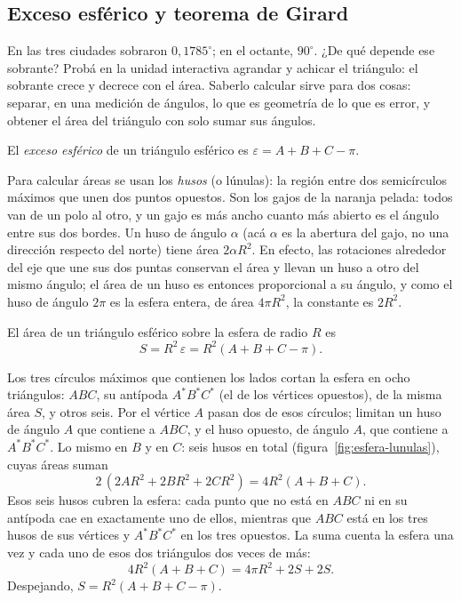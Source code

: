 \subsection{Exceso esférico y teorema de Girard}\label{sec:exceso-esferico}

En las tres ciudades sobraron \(0{,}1785^\circ\); en el octante, \(90^\circ\). ¿De qué depende
ese sobrante? Probá en la unidad interactiva agrandar y achicar el triángulo: el sobrante
crece y decrece con el área. Saberlo calcular sirve para dos cosas: separar, en una medición
de ángulos, lo que es geometría de lo que es error, y obtener el área del triángulo con solo
sumar sus ángulos.

\begin{definicion}
El \emph{exceso esférico} de un triángulo esférico es
\(\varepsilon=A+B+C-\pi\).
\end{definicion}

Para calcular áreas se usan los \emph{husos} (o lúnulas): la región entre dos semicírculos
máximos que unen dos puntos opuestos. Son los gajos de la naranja pelada: todos van de un polo
al otro, y un gajo es más ancho cuanto más abierto es el ángulo entre sus dos bordes. Un huso de
ángulo \(\alpha\) (acá \(\alpha\) es la abertura del gajo, no una dirección respecto del norte) tiene área \(2\alpha R^2\).
En efecto, las rotaciones alrededor del eje que une sus dos puntas conservan el área y llevan
un huso a otro del mismo ángulo; el área de un huso es entonces proporcional a su ángulo, y
como el huso de ángulo \(2\pi\) es la esfera entera, de área \(4\pi R^2\), la constante es
\(2R^2\).

\begin{teorema}[Girard]\label{teo:girard}
El área de un triángulo esférico sobre la esfera de radio \(R\) es
\[
  S=R^2\,\varepsilon=R^2(A+B+C-\pi).
\]
\end{teorema}

\begin{demostracion}
Los tres círculos máximos que contienen los lados cortan la esfera en ocho triángulos: \(ABC\),
su antípoda \(A^*B^*C^*\) (el de los vértices opuestos), de la misma área \(S\), y otros seis.
Por el vértice \(A\) pasan dos de esos círculos; limitan un huso de ángulo \(A\) que contiene a
\(ABC\), y el huso opuesto, de ángulo \(A\), que contiene a \(A^*B^*C^*\). Lo mismo en \(B\) y
en \(C\): seis husos en total (figura~\ref{fig:esfera-lunulas}), cuyas áreas suman
\[
  2\,(2AR^2+2BR^2+2CR^2)=4R^2(A+B+C).
\]
Esos seis husos cubren la esfera: cada punto que no está en \(ABC\) ni en su antípoda cae en
exactamente uno de ellos, mientras que \(ABC\) está en los tres husos de sus vértices y
\(A^*B^*C^*\) en los tres opuestos. La suma cuenta la esfera una vez y cada uno de esos dos
triángulos dos veces de más:
\[
  4R^2(A+B+C)=4\pi R^2+2S+2S .
\]
Despejando, \(S=R^2(A+B+C-\pi)\).
\end{demostracion}

